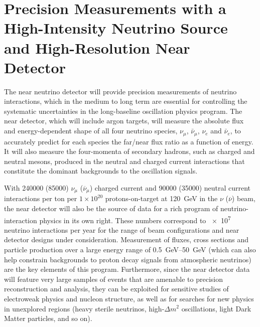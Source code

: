 %
%
\section{Precision Measurements with a High-Intensity Neutrino Source and High-Resolution Near Detector}


The near neutrino detector will provide precision measurements of
neutrino interactions, which in the medium to long term are essential
for controlling the systematic uncertainties in the long-baseline
oscillation physics program.  The near detector, which will include argon
targets, will measure the absolute flux and energy-dependent shape of
all four neutrino species, $\nu_\mu$, $\bar{\nu}_{\mu}$, $\nu_e$ and $\bar{\nu}_e$, to accurately
predict for each species the far/near flux ratio as a function of
energy.  It will also measure the four-momenta of secondary hadrons,
such as charged and neutral mesons, produced in the neutral and
charged current interactions that constitute the dominant backgrounds
to the oscillation signals.

With  \num{240000} (\num{85000}) $\nu_\mu$ ($\overline{\nu}_\mu$) charged current 
and \num{90000} (\num{35000})  neutral current interactions per ton per $1 \times 10^{20}$
protons-on-target at \SI{120}{GeV}  in the $\nu$ ($\overline\nu$) beam, the near detector
will also be the source of data for a rich program of neutrino-interaction 
physics in its own right.  These numbers correspond to
\num{e7}  neutrino interactions per year for the range of beam
configurations and near detector designs under consideration.
Measurement of fluxes, cross sections and particle production over a
large energy range of \SIrange{0.5}{50}{\GeV} (which can also help constrain
backgrounds to proton decay signals from atmospheric neutrinos) are the key
elements of this program.  
Furthermore, since the near detector data will feature very large
samples of events that are amenable to precision reconstruction and
analysis, they can be exploited for sensitive studies of electroweak
physics and nucleon structure, as well as for searches for new physics
in unexplored regions (heavy sterile neutrinos, high-$\Delta m^2$
oscillations, light Dark Matter particles, and so on). 


